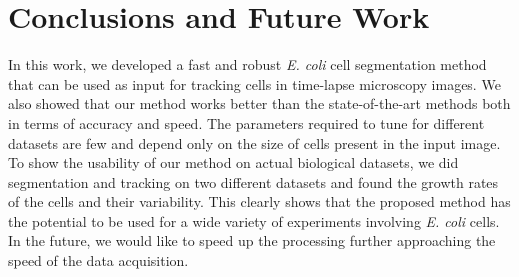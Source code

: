 \documentclass[journal]{IEEEtran}
\begin{document}
\section{Conclusions and Future Work}
In this work, we developed a fast and robust \textit{E. coli} cell segmentation method that can be used as input for tracking cells in time-lapse microscopy images. We also showed that our method works better than the state-of-the-art methods both in terms of accuracy and speed. The parameters required to tune for different datasets are few and depend only on the size of cells present in the input image. To show the usability of our method on actual biological datasets, we did segmentation and tracking on two different datasets and found the growth rates of the cells and their variability. This clearly shows that the proposed method has the potential to be used for a wide variety of experiments involving \textit{E. coli} cells. In the future, we would like to speed up the processing further approaching the speed of the data acquisition.




%
%

\end{document}
